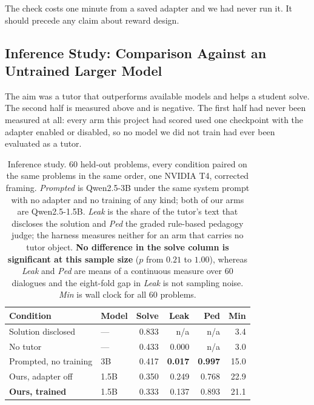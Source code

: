 \documentclass[conference]{IEEEtran}
\begin{document}
The check costs one minute from a saved adapter and we had never run it. It
should precede any claim about reward design.

\subsection{Inference Study: Comparison Against an Untrained Larger Model}
\label{sec:claims}

The aim was a tutor that outperforms available models and helps a student
solve. The second half is measured above and is negative. The first half had
never been measured at all: every arm this project had scored used one
checkpoint with the adapter enabled or disabled, so no model we did not train
had ever been evaluated as a tutor.

\begin{table}[t]
\caption{Inference study. 60 held-out problems, every condition paired on the
same problems in the same order, one NVIDIA T4, corrected framing.
\emph{Prompted} is Qwen2.5-3B under the same system prompt with no adapter and
no training of any kind; both of our arms are Qwen2.5-1.5B. \emph{Leak} is the
share of the tutor's text that discloses the solution and \emph{Ped} the graded
rule-based pedagogy judge; the harness measures neither for an arm that carries
no tutor object. \textbf{No difference in the solve column is significant at
this sample size} ($p$ from $0.21$ to $1.00$), whereas \emph{Leak} and
\emph{Ped} are means of a continuous measure over 60 dialogues and the
eight-fold gap in \emph{Leak} is not sampling noise. \emph{Min} is wall clock
for all 60 problems.}
\label{tab:inference}
\centering
\small
\begin{tabular}{llrrrr}
\toprule
\textbf{Condition} & \textbf{Model} & \textbf{Solve} & \textbf{Leak} &
\textbf{Ped} & \textbf{Min} \\
\midrule
Solution disclosed     & ---  & 0.833 & n/a            & n/a            & 3.4 \\
No tutor               & ---  & 0.433 & 0.000          & n/a            & 3.0 \\
Prompted, no training  & 3B   & 0.417 & \textbf{0.017} & \textbf{0.997} & 15.0 \\
Ours, adapter off      & 1.5B & 0.350 & 0.249          & 0.768          & 22.9 \\
\textbf{Ours, trained} & 1.5B & 0.333 & 0.137          & 0.893          & 21.1 \\
\bottomrule
\end{tabular}
\end{table}
\end{document}
